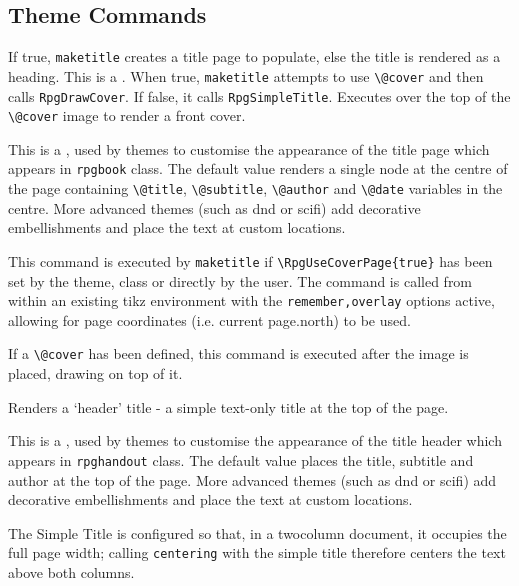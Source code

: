 		\subsection{Theme Commands}
		\begin{macrolist}
				{
					If true, \verb|maketitle| creates a title page to populate, else the title is rendered as a heading.
				}{
				}
				{
					This is a \backendCommand{}. When true, \verb|maketitle| attempts to use \verb|\@cover| and then calls \verb|RpgDrawCover|. If false, it calls \verb|RpgSimpleTitle|.
				}
			\RpgMacro{\RpgDrawCover,{{}}}
				{
					Executes over the top of the \verb|\@cover| image to render a front cover.
				}{}
				{
					This is a \placeholderCommand{}, used by themes to customise the appearance of the title page which appears in \verb|rpgbook| class. The default value renders a single node at the centre of the page containing \verb|\@title|, \verb|\@subtitle|, \verb|\@author| and \verb|\@date| variables in the centre. More advanced themes (such as dnd or scifi) add decorative embellishments and place the text at custom locations.

					This command is executed by \verb|maketitle| if \verb|\RpgUseCoverPage{true}| has been set by the theme, class or directly by the user. 
					The command is called from within an existing tikz environment with the \verb|remember,overlay| options active, allowing for page coordinates (i.e. current page.north) to be used.

					If a \verb|\@cover| has been defined, this command is executed after the image is placed, drawing on top of it.
				}
			\RpgMacro{\RpgSimpleTitle,{{}}}
				{
					Renders a `header' title - a simple text-only title at the top of the page.
				}{}
				{
					This is a \placeholderCommand{}, used by themes to customise the appearance of the title header which appears in \verb|rpghandout| class. The default value places the title, subtitle and author at the top of the page. More advanced themes (such as dnd or scifi) add decorative embellishments and place the text at custom locations.

					The Simple Title is configured so that, in a twocolumn document, it occupies the full page width; calling \verb|centering| with the simple title therefore centers the text above both columns. 
				}
		\end{macrolist}

